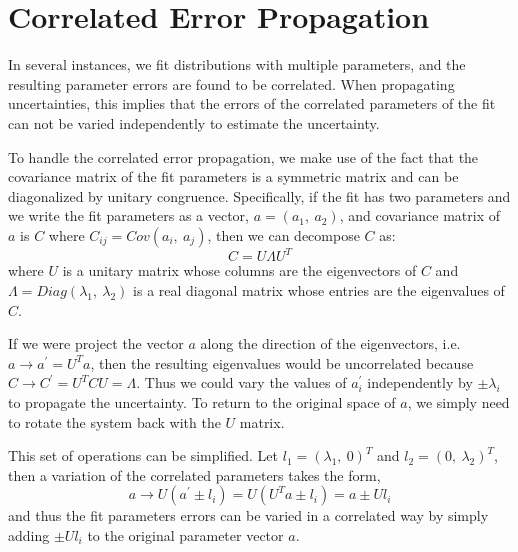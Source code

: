 \section{Correlated Error Propagation}
\label{app:correrr}
In several instances, we fit distributions with multiple parameters, and the resulting parameter errors are found to be correlated.  When propagating uncertainties, this implies that the errors of the correlated parameters of the fit can not be varied independently to estimate the uncertainty.  

To handle the correlated error propagation, we make use of the fact that the covariance matrix of the fit parameters is a symmetric matrix and can be diagonalized by unitary congruence.  Specifically, if the fit has two parameters and we write the fit parameters as a vector, $a = (a_1,\ a_2)$, and covariance matrix of $a$ is $C$ where $C_{ij} = Cov(a_i,\ a_j)$, then we can decompose $C$ as:
\begin{equation}
C = U \Lambda U^{T}
\end{equation}
where $U$ is a unitary matrix whose columns are the eigenvectors of $C$ and $\Lambda = Diag(\lambda_{1},\ \lambda_{2})$ is a real diagonal matrix whose entries are the eigenvalues of $C$.

If we were project the vector $a$ along the direction of the eigenvectors, i.e. $a \to a^{\prime} = U^{T}a$, then the resulting eigenvalues would be uncorrelated because $C \to C^{\prime} = U^{T} C U = \Lambda$.   Thus we could vary the values of $a^{\prime}_{i}$ independently by $\pm \lambda_i$ to propagate the uncertainty.  To return to the original space of $a$, we simply need to rotate the system back with the $U$ matrix.  

This set of operations can be simplified.  Let $l_1 = (\lambda_1,\ 0)^T$ and $l_2 = (0,\ \lambda_2)^T$, then a variation of the correlated parameters takes the form,
\begin{equation}
a \to U( a^{\prime} \pm l_i) = U( U^{T} a \pm l_i) = a \pm U l_{i}
\end{equation}
and thus the fit parameters errors can be varied in a correlated way by simply adding $\pm U l_{i}$ to the original parameter vector $a$.

